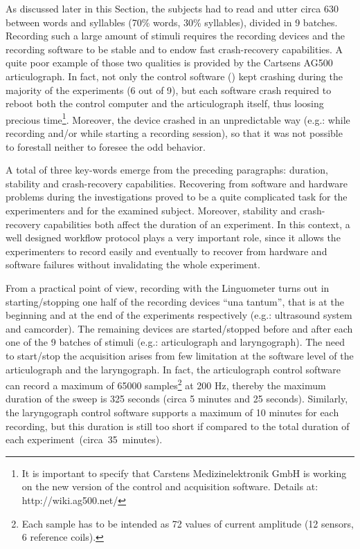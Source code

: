 As discussed later in this Section, the subjects had to read and utter circa 630
between words and syllables (70\% words, 30\% syllables), divided in 9 batches.
Recording such a large amount of stimuli requires the recording devices and
the recording software to be stable and to endow fast crash-recovery
capabilities.
A quite poor example of those two qualities is provided by the Cartsens AG500
articulograph. 
In fact, not only the control software () 
kept crashing during the majority of the experiments (6 out of 9), but each 
software crash required to reboot both the control computer and the 
articulograph itself, thus loosing precious time\footnote{It is important to
specify that Carstens Medizinelektronik GmbH is working on the new version of
the control and acquisition software. Details at: http://wiki.ag500.net/}. 
Moreover, the device crashed in an unpredictable
way (e.g.: while recording and/or while starting a recording session), so that
it was not possible to forestall neither to foresee the odd behavior.

A total of three key-words emerge from the preceding paragraphs: 
duration, stability and crash-recovery capabilities.
Recovering from software and hardware problems during the investigations proved
to be a quite complicated task for the experimenters and for the examined
subject.
Moreover, stability and crash-recovery capabilities both affect the duration
of an experiment. 
In this context, a well designed workflow protocol plays a very important role,
since it allows the experimenters to record easily and eventually to recover
from hardware and software failures without invalidating the whole experiment.

From a practical point of view, recording with the Linguometer turns out in
starting/stopping one half of the recording devices ``una tantum'', that is at
the beginning and at the end of the experiments respectively (e.g.: ultrasound 
system and
camcorder).
The remaining devices are started/stopped before and after each one of the 9
batches of stimuli (e.g.: articulograph and laryngograph).
The need to start/stop the acquisition arises from few limitation at the
software level of the articulograph and the laryngograph.
In fact, the articulograph control software can record a maximum of 65000 
samples\footnote{Each sample has to be intended as 72 values of current
amplitude (12 sensors, 6 reference coils).} at 200 Hz, thereby the maximum
duration of the sweep is 325 seconds (circa 5 minutes and 25 seconds).
Similarly, the laryngograph control software supports a maximum of 10 minutes
for each recording, but this duration is still too short if compared to the
total duration of each experiment~(circa~35~minutes).

